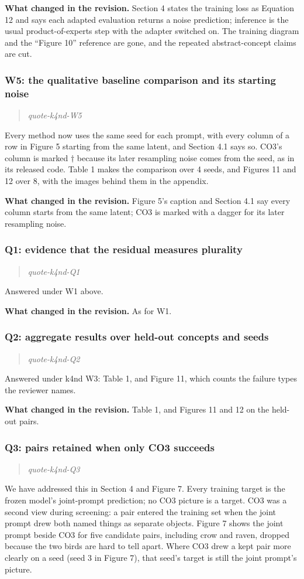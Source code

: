 \documentclass[11pt]{article}
\def\showquotes{}        %
\newcommand{\reviewquote}[2]{\ifdefined\showquotes\begin{quote}\color{rev}\itshape\csname quote-#1-#2\endcsname\end{quote}\fi}
\newcommand{\changed}[1]{\par{\color{chg}\textbf{What changed in the revision.}} #1\par}
\begin{document}
\changed{Section 4 states the training loss as Equation 12 and says each adapted evaluation returns a noise prediction; inference is the usual product-of-experts step with the adapter switched on. The training diagram and the ``Figure 10'' reference are gone, and the repeated abstract-concept claims are cut.}

\subsubsection*{W5: the qualitative baseline comparison and its starting noise}
\reviewquote{k4nd}{W5}

Every method now uses the same seed for each prompt, with every column of a row in Figure 5 starting from the same latent, and Section 4.1 says so. CO3's column is marked $\dagger$ because its later resampling noise comes from the seed, as in its released code. Table 1 makes the comparison over 4 seeds, and Figures 11 and 12 over 8, with the images behind them in the appendix.

\changed{Figure 5's caption and Section 4.1 say every column starts from the same latent; CO3 is marked with a dagger for its later resampling noise.}

\subsubsection*{Q1: evidence that the residual measures plurality}
\reviewquote{k4nd}{Q1}

Answered under W1 above.

\changed{As for W1.}

\subsubsection*{Q2: aggregate results over held-out concepts and seeds}
\reviewquote{k4nd}{Q2}

Answered under k4nd W3: Table 1, and Figure 11, which counts the failure types the reviewer names.

\changed{Table 1, and Figures 11 and 12 on the held-out pairs.}

\subsubsection*{Q3: pairs retained when only CO3 succeeds}
\reviewquote{k4nd}{Q3}

We have addressed this in Section 4 and Figure 7. Every training target is the frozen model's joint-prompt prediction; no CO3 picture is a target. CO3 was a second view during screening: a pair entered the training set when the joint prompt drew both named things as separate objects. Figure 7 shows the joint prompt beside CO3 for five candidate pairs, including crow and raven, dropped because the two birds are hard to tell apart. Where CO3 drew a kept pair more clearly on a seed (seed 3 in Figure 7), that seed's target is still the joint prompt's picture.
\end{document}
